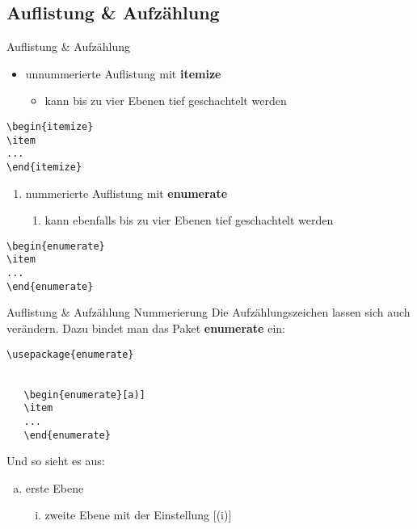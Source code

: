 \subsection{Auflistung \& Aufzählung}
\begin{frame}[fragile]{Auflistung \& Aufzählung}
\begin{itemize}
\item unnummerierte Auflistung mit \textbf{itemize}
\begin{itemize}
\item kann bis zu vier Ebenen tief geschachtelt werden
\end{itemize}
\end{itemize}
\begin{lstlisting}[style=tex]
\begin{itemize}
\item
...
\end{itemize}\end{lstlisting}\pause

\begin{enumerate}
\item nummerierte Auflistung mit \textbf{enumerate}
\begin{enumerate}
\item kann ebenfalls bis zu vier Ebenen tief geschachtelt werden
\end{enumerate}
\end{enumerate}
\begin{lstlisting}[style=tex]
\begin{enumerate}
\item
...
\end{enumerate}\end{lstlisting}
\end{frame}

\begin{frame}[fragile]{Auflistung \& Aufzählung Nummerierung}
Die Aufzählungszeichen lassen sich auch verändern.
Dazu bindet man das Paket \textbf{enumerate} ein:
\begin{lstlisting}[style=tex]
\usepackage{enumerate}


   \begin{enumerate}[a)]
   \item
   ...
   \end{enumerate}
\end{lstlisting}\pause

\bigskip
Und so sieht es aus:
\begin{enumerate}[a)]
\item erste Ebene
\begin{enumerate}[(i)]
\item zweite Ebene mit der Einstellung [(i)]
\end{enumerate}
\end{enumerate}
\end{frame}

